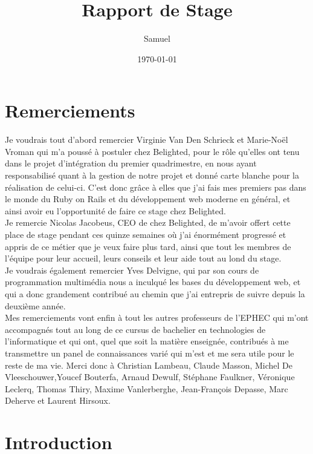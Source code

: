 \documentclass{report}
\title{Rapport de Stage}
\author{Samuel \bsc{Monroe}}
\date{\today}
\begin{document}
\maketitle

\newpage
\thispagestyle{empty}
\mbox{}

\tableofcontents

\chapter*{Remerciements}

  Je voudrais tout d'abord remercier Virginie Van Den Schrieck et Marie-Noël Vroman qui m'a poussé à postuler chez Belighted, pour
  le rôle qu'elles ont tenu dans le projet d'intégration du premier quadrimestre,
  en nous ayant responsabilisé quant à la gestion de notre projet et donné carte
  blanche pour la réalisation de celui-ci.
  C'est donc grâce à elles que j'ai fais mes premiers pas dans le monde du Ruby on Rails
  et du développement web moderne en général, et ainsi avoir eu l'opportunité de faire ce stage chez Belighted.\\

  Je remercie Nicolas Jacobeus, CEO de chez Belighted, de m'avoir offert cette place de stage pendant ces quinze
  semaines où j'ai énormément progressé et appris de ce métier que je veux faire plus tard, ainsi que tout les membres
  de l'équipe pour leur accueil, leurs conseils et leur aide tout au lond du stage.\\

  Je voudrais également remercier Yves Delvigne, qui par son cours de programmation multimédia
  nous a inculqué les bases du développement web, et qui a donc grandement contribué
  au chemin que j'ai entrepris de suivre depuis la deuxième année.\\

  Mes remerciements vont enfin à tout les autres professeurs de l'EPHEC qui m'ont accompagnés tout au long
  de ce cursus de bachelier en technologies de l'informatique et qui ont, quel que soit la matière
  enseignée, contribués à me transmettre un panel de connaissances varié qui m'est et me sera utile pour
  le reste de ma vie. Merci donc à Christian Lambeau, Claude Masson, Michel De Vleeschouwer,Youcef Bouterfa, Arnaud Dewulf,
  Stéphane Faulkner, Véronique Leclerq, Thomas Thiry, Maxime Vanlerberghe, Jean-François Depasse, Marc Deherve et Laurent Hirsoux.\\

\chapter{Introduction}
\end{document}
